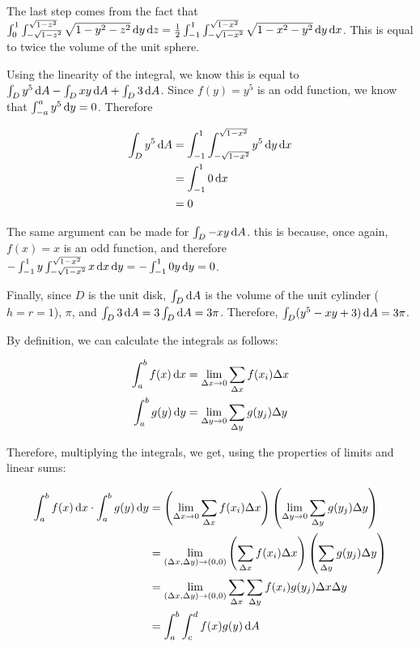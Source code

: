 The last step comes from the fact that $\int_0^1 \int_{-\sqrt{1 - z^2}}^{\sqrt{1 - z^2}} \sqrt{1 - y^2 - z^2} \mathop{}\!\mathrm{d} y \mathop{}\!\mathrm{d} z = \frac{1}{2} \int_{-1}^1 \int_{-\sqrt{1 - x^2}}^{\sqrt{1 - x^2}} \sqrt{1 - x^2 - y^2} \mathop{}\!\mathrm{d} y \mathop{}\!\mathrm{d} x$. This is equal to twice the volume of the unit sphere.

Using the linearity of the integral, we know this is equal to $\int_D y^5 \mathop{}\!\mathrm{d} A - \int_D xy \mathop{}\!\mathrm{d} A + \int_D 3 \mathop{}\!\mathrm{d} A$. Since $f(y) = y^5$ is an odd function, we know that $\int_{-a}^a y^5 \mathop{}\!\mathrm{d} y = 0$. Therefore

\begin{align*}
  \int_D y^5 \mathop{}\!\mathrm{d} A &= \int_{-1}^1 \int_{-\sqrt{1 - x^2}}^{\sqrt{1 - x^2}} y^5 \mathop{}\!\mathrm{d} y \mathop{}\!\mathrm{d} x \\
  &= \int_{-1}^1 0 \mathop{}\!\mathrm{d} x \\
  &= 0
\end{align*}

The same argument can be made for $\int_D -xy \mathop{}\!\mathrm{d} A$. this is because, once again, $f(x) = x$ is an odd function, and therefore $-\int_{-1}^1 y\int_{-\sqrt{1 - x^2}}^{\sqrt{1 - x^2}} x \mathop{}\!\mathrm{d} x \mathop{}\!\mathrm{d} y = -\int_{-1}^1 0y \mathop{}\!\mathrm{d} y = 0$.

Finally, since $D$ is the unit disk, $\int_D \mathop{}\!\mathrm{d} A$ is the volume of the unit cylinder ($h = r = 1$), $\pi$, and $\int_D 3 \mathop{}\!\mathrm{d} A = 3\int_D \mathop{}\!\mathrm{d} A = 3\pi$. Therefore, $\int_D (y^5 - xy + 3) \mathop{}\!\mathrm{d} A = 3\pi$.

By definition, we can calculate the integrals as follows:

\begin{align*}
  \int_a^b f(x) \mathop{}\!\mathrm{d} x &= \lim_{\Delta x \rightarrow 0} \sum_{\Delta x} f(x_i) \Delta x \\
  \int_a^b g(y) \mathop{}\!\mathrm{d} y &= \lim_{\Delta y \rightarrow 0} \sum_{\Delta y} g(y_j) \Delta y
\end{align*}

Therefore, multiplying the integrals, we get, using the properties of limits and linear sums:

\begin{align*}
  \int_a^b f(x) \mathop{}\!\mathrm{d} x \cdot \int_a^b g(y) \mathop{}\!\mathrm{d} y &= \left(\lim_{\Delta x \rightarrow 0} \sum_{\Delta x} f(x_i) \Delta x\right)\left(\lim_{\Delta y \rightarrow 0} \sum_{\Delta y} g(y_j) \Delta y\right) \\
  &= \lim_{(\Delta x, \Delta y) \rightarrow (0, 0)} \left(\sum_{\Delta x} f(x_i) \Delta x\right)\left(\sum_{\Delta y} g(y_j) \Delta y\right) \\
  &= \lim_{(\Delta x, \Delta y) \rightarrow (0, 0)} \sum_{\Delta x}\sum_{\Delta y} f(x_i) g(y_j) \Delta x \Delta y \\
  &= \int_a^b \int_c^d f(x)g(y) \mathop{}\!\mathrm{d} A
\end{align*}

